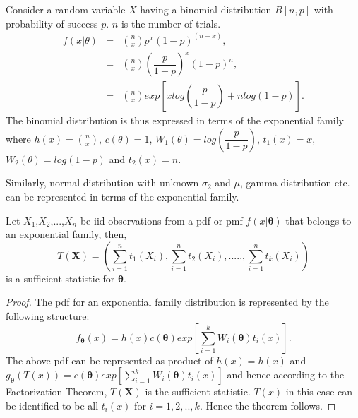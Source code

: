 \documentclass[a4paper,english,12pt]{article}
\newcommand{\bX}{\mathbf{X}}
\newcommand{\btheta}{\boldsymbol{\theta}}
\begin{document}
\begin{exmp}
\par Consider a random variable $X$ having a binomial distribution $B[n,p]$ with probability of success $p$. $n$ is the number of trials. 
\begin{eqnarray}
f(x|\theta) &=& \binom{n}{x}p^{x}(1-p)^{(n-x)},\nonumber \\
&=& \binom{n}{x}\left(\dfrac{p}{1-p}\right)^x(1-p)^n,\nonumber \\
&=& \binom{n}{x}exp\left[x log\left(\dfrac{p}{1-p}\right) + n log(1-p)\right].
\end{eqnarray}
 The binomial distribution is thus expressed in terms of the exponential family where $h(x) = \binom{n}{x}$, $c(\theta) = 1$, $W_1(\theta) = log\left(\dfrac{p}{1-p}\right)$, $t_1(x) = x$, $W_2(\theta) = log(1-p)$ and $t_2(x) = n$.
\end {exmp}
Similarly, normal distribution with unknown $\sigma_2$ and $\mu$, gamma distribution etc. can be represented in terms of the exponential family.
\begin{thm}
Let $X_1$,$X_2$,...,$X_n$ be iid observations from a pdf or pmf $f(x|\btheta)$ that belongs to an exponential family, then, 
\begin{equation}
T(\bX) = \left(\sum_{i=1}^{n}t_1(X_i), \sum_{i=1}^{n}t_2(X_i),.....,\sum_{i=1}^{n}t_k(X_i)\right)
\end{equation}
is a sufficient statistic for $\btheta$.
\end{thm}
\begin{proof}
The pdf for an exponential family distribution is represented by the following structure:
\begin{equation}
f_{\btheta}(x) = h(x)c(\btheta)exp\left[\sum_{i=1}^{k} W_i(\btheta)t_i(x)\right].
\end{equation}
The above pdf can be represented as product of $h(x) = h(x)$ and $g_{\btheta}(T(x)) = c(\btheta)exp\left[\sum_{i=1}^{k} W_i(\btheta)t_i(x)\right]$ and hence according to the Factorization Theorem, $T(\bX)$ is the sufficient statistic. $T(x)$ in this case can be identified to be all $t_i(x)$ for $i=1,2,..,k$. Hence the theorem follows.
\end{proof}
\end{document}
